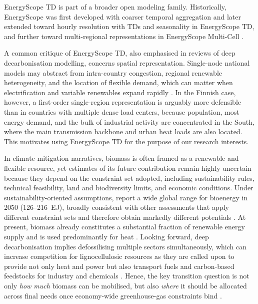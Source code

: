 \documentclass{article}
\begin{document}
EnergyScope TD is part of a broader open modeling family. Historically, EnergyScope was first developed with coarser temporal aggregation and later extended toward hourly resolution with TDs and seasonality in EnergyScope TD, and further toward multi-regional representations in EnergyScope Multi-Cell \citep{hernandez_energyscope_2021,thiran_exploring_2025,borasio_deep_2022}.

A common critique of EnergyScope TD, also emphasised in reviews of deep decarbonisation modelling, concerns spatial representation. Single-node national models may abstract from intra-country congestion, regional renewable heterogeneity, and the location of flexible demand, which can matter when electrification and variable renewables expand rapidly \citep{borasio_deep_2022,limpens_energyscope_2024}. In the Finnish case, however, a first-order single-region representation is arguably more defensible than in countries with multiple dense load centers, because population, most energy demand, and the bulk of industrial activity are concentrated in the South, where the main transmission backbone and urban heat loads are also located. This motivates using EnergyScope TD for the purpose of our research interests. 


In climate-mitigation narratives, biomass is often framed as a renewable and flexible resource, yet estimates of its future contribution remain highly uncertain because they depend on the constraint set adopted, including sustainability rules, technical feasibility, land and biodiversity limits, and economic conditions. Under sustainability-oriented assumptions, \citet{beringer_bioenergy_2011} report a wide global range for bioenergy in 2050 (126--216~EJ), broadly consistent with other assessments that apply different constraint sets and therefore obtain markedly different potentials \citep{haberl_global_2010,schueler_global_2013,searle_reassessment_2015,strapasson_global_2017,iea_bioenergy_2023}. At present, biomass already constitutes a substantial fraction of renewable energy supply and is used predominantly for heat \citep{iea_key_2020,iea_bioenergy_2023}. Looking forward, deep decarbonisation implies defossilising multiple sectors simultaneously, which can increase competition for lignocellulosic resources as they are called upon to provide not only heat and power but also transport fuels and carbon-based feedstocks for industry and chemicals \citep{wwf_energy_2011,daioglou_competing_2015}. Hence, the key transition question is not only \emph{how much} biomass can be mobilised, but also \emph{where} it should be allocated across final needs once economy-wide greenhouse-gas constraints bind \citep{colla_optimal_2022}.
\end{document}
